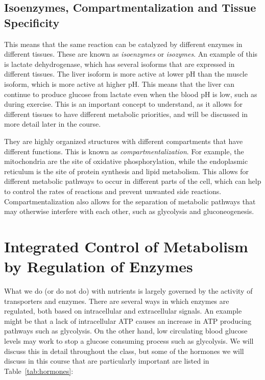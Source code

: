 \documentclass{tufte-handout}
\begin{document}
\pagebreak
\subsection{Isoenzymes, Compartmentalization and Tissue Specificity}
  This means that the same reaction can be catalyzed by different enzymes in different tissues.  These are known as \emph{isoenzymes} or \emph{isozymes}.  An example of this is lactate dehydrogenase, which has several isoforms that are expressed in different tissues.  The liver isoform is more active at lower pH than the muscle isoform, which is more active at higher pH.  This means that the liver can continue to produce glucose from lactate even when the blood pH is low, such as during exercise.  This is an important concept to understand, as it allows for different tissues to have different metabolic priorities, and will be discussed in more detail later in the course.

  They are highly organized structures with different compartments that have different functions.  This is known as \emph{compartmentalization}.  For example, the mitochondria are the site of oxidative phosphorylation, while the endoplasmic reticulum is the site of protein synthesis and lipid metabolism.  This allows for different metabolic pathways to occur in different parts of the cell, which can help to control the rates of reactions and prevent unwanted side reactions.  Compartmentalization also allows for the separation of metabolic pathways that may otherwise interfere with each other, such as glycolysis and gluconeogenesis.

\section{Integrated Control of Metabolism by Regulation of Enzymes}

What we do (or do not do) with nutrients is largely governed by the activity of transporters and enzymes.  There are several ways in which enzymes are regulated, both based on intracellular and extracellular signals.  An example might be that a lack of intracellular ATP causes an increase in ATP producing pathways such as glycolysis.  On the other hand, low circulating blood glucose levels may work to stop a glucose consuming process such as glycolysis.  We will discuss this in detail throughout the class, but some of the hormones we will discuss in this course that are particularly important are listed in Table~\ref{tab:hormones}:
\end{document}
